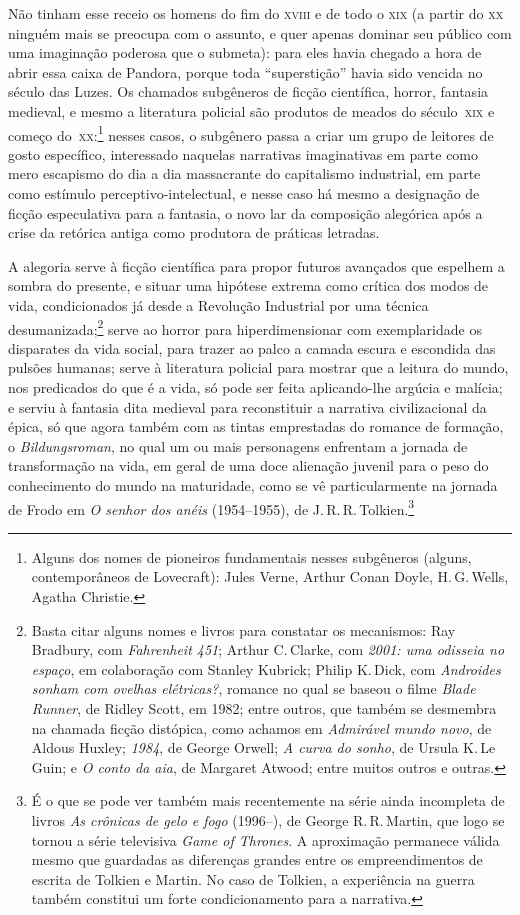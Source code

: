 Não tinham esse receio os homens do fim do \textsc{xviii} e de todo o \textsc{xix} (a
partir do \textsc{xx} ninguém mais se preocupa com o assunto, e quer apenas
dominar seu público com uma imaginação poderosa que o submeta): para
eles havia chegado a hora de abrir essa caixa de Pandora, porque toda
``superstição'' havia sido vencida no século das Luzes. Os chamados
subgêneros de ficção científica, horror,  fantasia
medieval, e mesmo a literatura policial são produtos de meados
do século~\textsc{xix} e começo do~\textsc{xx}:\footnote{Alguns dos nomes de pioneiros
  fundamentais nesses subgêneros (alguns, contemporâneos de Lovecraft):
  Jules Verne, Arthur Conan Doyle, H.\,G.\,Wells, Agatha Christie.} nesses casos, o subgênero
passa a criar um grupo de leitores de gosto específico, interessado
naquelas narrativas imaginativas em parte como mero escapismo do
dia a dia massacrante do capitalismo industrial, em parte como
estímulo perceptivo-intelectual, e nesse caso há mesmo a
designação de ficção especulativa para a fantasia, o novo lar da
composição alegórica após a crise da retórica antiga como produtora de
práticas letradas.

A alegoria serve à ficção científica para propor futuros
avançados que espelhem a sombra do presente, e situar uma
hipótese extrema como crítica dos modos de vida, condicionados já desde
a Revolução Industrial por uma técnica desumanizada;\footnote{Basta
  citar alguns nomes e livros para constatar os mecanismos: Ray
  Bradbury, com \emph{Fahrenheit 451}; Arthur C.\,Clarke, 
  com \emph{2001: uma odisseia no espaço}, em colaboração com Stanley 
  Kubrick; Philip K.\,Dick,
  com \emph{Androides sonham com ovelhas elétricas?}, romance no qual se 
  baseou o filme \emph{Blade Runner}, de Ridley Scott, em 1982; entre outros,
  que também se desmembra na chamada ficção distópica, como
  achamos em \emph{Admirável mundo novo}, de Aldous Huxley; \emph{1984}, de
  George Orwell; \emph{A curva do sonho}, de Ursula K.\,Le Guin; e
  \emph{O conto da aia}, de Margaret Atwood; entre muitos outros e
  outras.} serve ao horror para hiperdimensionar com exemplaridade os
disparates da vida social, para trazer ao palco a camada escura e
escondida das pulsões humanas; serve à literatura policial para mostrar
que a leitura do mundo, nos predicados do que é a vida, só pode ser feita
aplicando-lhe argúcia e malícia; e serviu à fantasia dita
medieval para reconstituir a narrativa civilizacional da épica,
só que agora também com as tintas emprestadas do romance de formação, o
\emph{Bildungsroman}, no qual um ou mais personagens enfrentam a jornada
de transformação na vida, em geral de uma doce alienação juvenil para o
peso do conhecimento do mundo na maturidade, como se vê particularmente
na jornada de Frodo em \emph{O senhor dos anéis} (1954--1955), de J.\,R.\,R.\,Tolkien.\footnote{É o que se pode ver também mais
  recentemente na série ainda incompleta de livros \emph{As crônicas de gelo e fogo} (1996--), de George R.\,R.\,Martin, que logo se tornou
  a série televisiva \emph{Game of Thrones}. A aproximação permanece
  válida mesmo que guardadas as diferenças grandes entre os
  empreendimentos de escrita de Tolkien e Martin. No caso de Tolkien, a
  experiência na guerra também constitui um forte condicionamento para a
  narrativa.}

